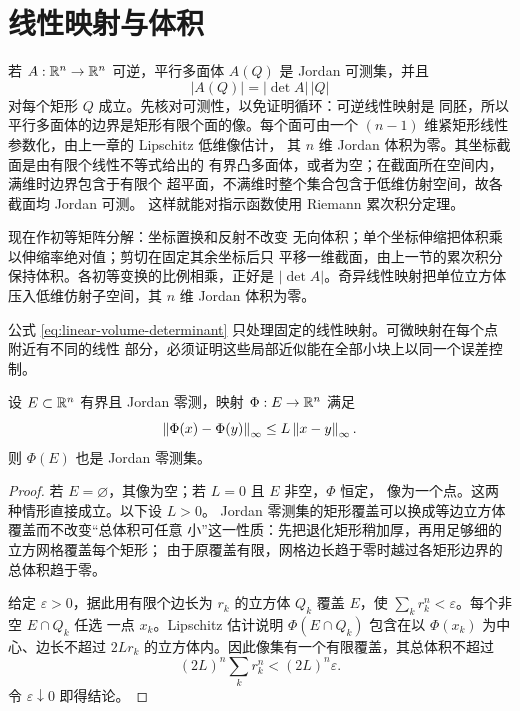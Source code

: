 \section{线性映射与体积}

若 \(A:\mathbb{R}^n\to\mathbb{R}^n\) 可逆，平行多面体 \(A(Q)\) 是 Jordan 可测集，并且
\begin{equation}
\label{eq:linear-volume-determinant}
 |A(Q)|=|\det A|\,|Q|
\end{equation}
对每个矩形 \(Q\) 成立。先核对可测性，以免证明循环：可逆线性映射是
同胚，所以平行多面体的边界是矩形有限个面的像。每个面可由一个
\((n-1)\) 维紧矩形线性参数化，由上一章的 Lipschitz 低维像估计，
其 \(n\) 维 Jordan 体积为零。其坐标截面是由有限个线性不等式给出的
有界凸多面体，或者为空；在截面所在空间内，满维时边界包含于有限个
超平面，不满维时整个集合包含于低维仿射空间，故各截面均 Jordan 可测。
这样就能对指示函数使用 Riemann 累次积分定理。

现在作初等矩阵分解：坐标置换和反射不改变
无向体积；单个坐标伸缩把体积乘以伸缩率绝对值；剪切在固定其余坐标后只
平移一维截面，由上一节的累次积分保持体积。各初等变换的比例相乘，正好是
\(|\det A|\)。奇异线性映射把单位立方体压入低维仿射子空间，其
\(n\) 维 Jordan 体积为零。

公式 \eqref{eq:linear-volume-determinant} 只处理固定的线性映射。可微映射在每个点附近有不同的线性
部分，必须证明这些局部近似能在全部小块上以同一个误差控制。

\begin{lemma}
\label{lem:lipschitz-jordan-null}
设 \(E\subset\mathbb{R}^n\) 有界且 Jordan 零测，映射
\(\Phi:E\to\mathbb{R}^n\) 满足
\[
 \left\lVert\Phi(x)-\Phi(y)\right\rVert_\infty
 \le L\left\lVert x-y\right\rVert_\infty.
\]
则 \(\Phi(E)\) 也是 Jordan 零测集。
\end{lemma}

\begin{proof}
若 $E=\varnothing$，其像为空；若 $L=0$ 且 $E$ 非空，$\Phi$ 恒定，
像为一个点。这两种情形直接成立。以下设 $L>0$。
Jordan 零测集的矩形覆盖可以换成等边立方体覆盖而不改变“总体积可任意
小”这一性质：先把退化矩形稍加厚，再用足够细的立方网格覆盖每个矩形；
由于原覆盖有限，网格边长趋于零时越过各矩形边界的总体积趋于零。

给定 \(\varepsilon>0\)，据此用有限个边长为 \(r_k\) 的立方体 \(Q_k\) 覆盖
\(E\)，使 \(\sum_kr_k^n<\varepsilon\)。每个非空 \(E\cap Q_k\) 任选
一点 \(x_k\)。Lipschitz 估计说明
\(\Phi(E\cap Q_k)\) 包含在以 \(\Phi(x_k)\) 为中心、边长不超过
\(2Lr_k\) 的立方体内。因此像集有一个有限覆盖，其总体积不超过
\[
 (2L)^n\sum_kr_k^n<(2L)^n\varepsilon.
\]
令 \(\varepsilon\downarrow0\) 即得结论。
\end{proof}

